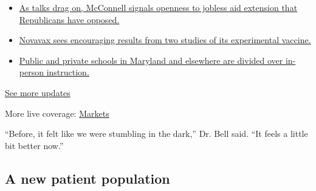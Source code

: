 \begin{itemize}
\tightlist
\item
  \href{https://www.nytimes3xbfgragh.onion/2020/08/04/world/coronavirus-cases.html?action=click\&pgtype=Article\&state=default\&region=MAIN_CONTENT_1\&context=storylines_live_updates\#link-2daa96b5}{As
  talks drag on, McConnell signals openness to jobless aid extension
  that Republicans have opposed.}
\item
  \href{https://www.nytimes3xbfgragh.onion/2020/08/04/world/coronavirus-cases.html?action=click\&pgtype=Article\&state=default\&region=MAIN_CONTENT_1\&context=storylines_live_updates\#link-1228a480}{Novavax
  sees encouraging results from two studies of its experimental
  vaccine.}
\item
  \href{https://www.nytimes3xbfgragh.onion/2020/08/04/world/coronavirus-cases.html?action=click\&pgtype=Article\&state=default\&region=MAIN_CONTENT_1\&context=storylines_live_updates\#link-4825b93}{Public
  and private schools in Maryland and elsewhere are divided over
  in-person instruction.}
\end{itemize}

\href{https://www.nytimes3xbfgragh.onion/2020/08/04/world/coronavirus-cases.html?action=click\&pgtype=Article\&state=default\&region=MAIN_CONTENT_1\&context=storylines_live_updates}{See
more updates}

More live coverage:
\href{https://www.nytimes3xbfgragh.onion/live/2020/08/04/business/stock-market-today-coronavirus?action=click\&pgtype=Article\&state=default\&region=MAIN_CONTENT_1\&context=storylines_live_updates}{Markets}

``Before, it felt like we were stumbling in the dark,'' Dr. Bell said.
``It feels a little bit better now.''

\hypertarget{a-new-patient-population}{%
\subsection{A new patient population}\label{a-new-patient-population}}


